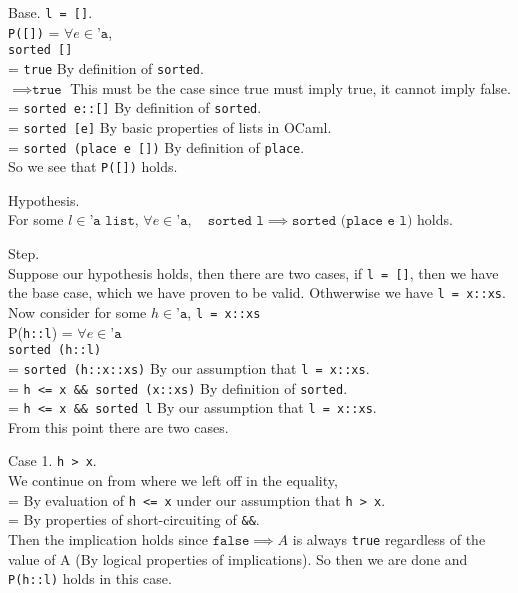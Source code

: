 \documentclass{article}
\begin{document}
\noindent
Base. \texttt{l = []}. \\
\indent \texttt{P([])} = $\forall e \in \texttt{'a}$, \\
\indent \texttt{sorted []} \\
\indent = \texttt{true} \qquad By definition of \texttt{sorted}. \\
\indent $\implies \texttt{true}$ \qquad This must be the case since true must imply true, it cannot imply false. \\
\indent = \texttt{sorted e::[]} \qquad By definition of \texttt{sorted}. \\
\indent = \texttt{sorted [e]} \qquad By basic properties of lists in OCaml. \\
\indent = \texttt{sorted (place e [])} \qquad By definition of \texttt{place}. \\
\noindent So we see that \texttt{P([])} holds.


\bigskip

\noindent
Hypothesis. \\
\indent For some $l \in \texttt{'a list}$, $\forall e \in \texttt{'a}, \quad \texttt{sorted l} \implies \texttt{sorted (place e l)}$ holds.

\bigskip

\noindent
Step. \\
Suppose our hypothesis holds, then there are two cases, if \texttt{l = []}, then we have
the base case, which we have proven to be valid. Othwerwise we have \texttt{l = x::xs}.
Now consider for some $h \in \texttt{'a}$, \texttt{l = x::xs} \\
\indent P(\texttt{h::l}) = $\forall e \in \texttt{'a}$ \\
\indent \texttt{sorted (h::l)} \\
\indent = \texttt{sorted (h::x::xs)} \qquad By our assumption that \texttt{l = x::xs}. \\
\indent = \texttt{h <= x \&\& sorted (x::xs)} \qquad By definition of \texttt{sorted}. \\
\indent = \texttt{h <= x \&\& sorted l} \qquad By our assumption that \texttt{l = x::xs}. \\
\noindent From this point there are two cases.

\noindent Case 1. \texttt{h > x}. \\
\indent We continue on from where we left off in the equality, \\
\indent =  \qquad By evaluation of \texttt{h <= x} under our assumption that \texttt{h > x}. \\
\indent =  \qquad By properties of short-circuiting of \texttt{\&\&}.\\
\indent Then the implication holds since $\texttt{false} \implies A$ is always
\texttt{true} regardless of the value of A (By logical properties of implications).
So then we are done and \texttt{P(h::l)} holds in this case.
\end{document}
